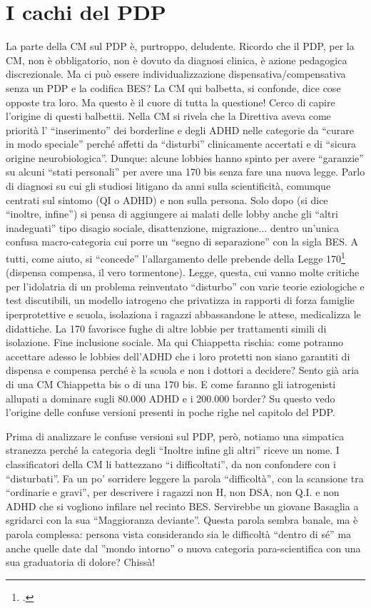 \section*{I cachi del PDP}
La parte della CM sul PDP è, purtroppo, deludente.  Ricordo che il PDP, per la CM,  non è obbligatorio, non è dovuto da diagnosi clinica, è  azione pedagogica discrezionale. Ma ci può essere individualizzazione  dispensativa/compensativa senza un PDP e la codifica BES? La CM qui balbetta, si confonde, dice cose opposte tra loro. Ma questo è il cuore di tutta la questione!
Cerco di capire l'origine di questi balbettii. Nella CM si  rivela che la Direttiva aveva come priorità  l’ “inserimento” dei borderline e degli ADHD nelle categorie da “curare in modo speciale” perché affetti da “disturbi” clinicamente accertati e di “sicura origine neurobiologica”. Dunque:  alcune lobbies hanno spinto per avere “garanzie” su alcuni “stati personali” per avere una 170 bis senza fare una nuova legge. Parlo di diagnosi su cui gli studiosi litigano da anni sulla scientificità, comunque centrati sul sintomo (QI o ADHD) e non sulla persona. Solo dopo (si dice “inoltre, infine”) si pensa di aggiungere ai malati delle lobby  anche gli “altri inadeguati” tipo disagio sociale, disattenzione, migrazione... dentro un'unica confusa macro-categoria cui porre un “segno di separazione” con la sigla BES. A tutti, come aiuto,  si “concede” l'allargamento delle prebende della Legge 170\footcite{legge170} (dispensa  compensa,  il vero tormentone). Legge, questa,  cui vanno molte critiche per l'idolatria di un problema reinventato “disturbo” con varie teorie eziologiche e test discutibili,  un modello iatrogeno  che privatizza in rapporti di forza famiglie iperprotettive e scuola, isolaziona i ragazzi abbassandone le attese, medicalizza le didattiche. La 170 favorisce  fughe di altre lobbie per trattamenti simili di isolazione. Fine inclusione sociale. Ma qui  Chiappetta rischia: come potranno accettare adesso le lobbies dell'ADHD che i loro protetti non siano garantiti di dispensa e compensa perché è la scuola e non i dottori a decidere? Sento già aria di una CM Chiappetta bis o di una 170 bis. E come faranno gli iatrogenisti  allupati a dominare sugli 80.000 ADHD e i 200.000 border? Su questo vedo l'origine delle confuse versioni presenti in poche righe nel capitolo del PDP.

Prima di analizzare le confuse versioni sul PDP, però, notiamo una simpatica stranezza perché la categoria degli “Inoltre infine gli altri” riceve un nome. I classificatori della CM li battezzano “i difficoltati”, da non confondere con i “disturbati”. Fa un po’ sorridere leggere  la parola “difficoltà”, con   la scansione tra “ordinarie e gravi”,  per descrivere i ragazzi non H,  non DSA,  non Q.I. e  non ADHD che si vogliono infilare nel recinto BES. Servirebbe un giovane Basaglia a sgridarci con la sua “Maggioranza deviante”. Questa parola sembra banale, ma è parola complessa: persona vista considerando sia le difficoltà “dentro di sé” ma anche quelle date dal ”mondo intorno” o nuova categoria para-scientifica con una sua graduatoria di dolore?  Chissà!

